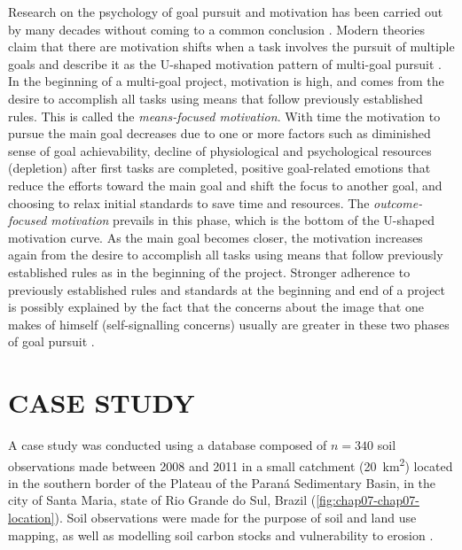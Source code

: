 Research on the psychology of goal pursuit and motivation has been carried out by many decades without coming 
to a common conclusion \cite{Toure-TilleryEtAl2011a, Hull1932}. Modern theories claim that there are motivation
shifts when a task involves the pursuit of multiple goals and describe it as the U-shaped motivation pattern of 
multi-goal pursuit \cite{BonezziEtAl2011, Toure-TilleryEtAl2011a}. In the beginning of a multi-goal project, 
motivation is high, and comes from the desire to accomplish all tasks using means that follow previously 
established rules. This is called the \emph{means-focused motivation}. With time the motivation to pursue the 
main goal decreases due to one or more factors such as diminished sense of goal achievability, decline 
of physiological and psychological resources (depletion) after first tasks are completed, positive goal-related 
emotions that reduce the efforts toward the main goal and shift the focus to another goal, and choosing to 
relax initial standards to save time and resources. The \emph{outcome-focused motivation} prevails in this 
phase, which is the bottom of the U-shaped motivation curve. As the main goal becomes closer, the motivation 
increases again from the desire to accomplish all tasks using means that follow previously established rules as 
in the beginning of the project. Stronger adherence to previously established rules and standards at the 
beginning and end of a project is possibly explained by the fact that the concerns about the image that one 
makes of himself (self-signalling concerns) usually are greater in these two phases of goal pursuit 
\cite{Toure-TilleryEtAl2011}.

\section{CASE STUDY}

A case study was conducted using a database composed of $n = 340$ soil observations made between \num{2008} 
and \num{2011} in a small catchment (\SI{20}{\km\squared}) located in the southern border of the Plateau of 
the Paraná Sedimentary Basin, in the city of Santa Maria, state of Rio Grande do Sul, Brazil 
(\autoref{fig:chap07-chap07-location}). Soil observations were made for the purpose of soil and land use 
mapping, as well as modelling soil carbon stocks and vulnerability to erosion \cite{Miguel2010, 
Samuel-Rosa2009, MouraBueno2012, Miguel2013}.

